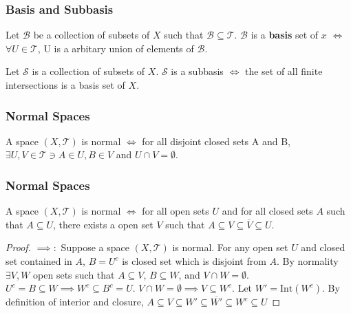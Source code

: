 \documentclass{beamer}
\newcommand*{\T}{\mathcal{T}}
\newcommand*{\B}{\mathcal{B}}
\newcommand*{\subeq}{\subseteq}
\newcommand*{\empset}{\emptyset}
\begin{document}
\begin{frame}
    \frametitle{Basis and Subbasis}

    \begin{definition}
        Let $\mathcal{B}$ be a collection of subsets of $X$ such that $\B \subeq \T$. $\mathcal{B}$ is a \textbf{basis} set of $x$ $\iff$ $\forall U \in \T$, U is a arbitary union of elements of $\B$.             
    \end{definition}
    
    \begin{definition}
        Let $\mathcal{S}$ is a collection of subsets of $X$. $\mathcal{S}$ is a subbasis $\iff$ the set of all finite intersections is a basis set of $X$.        
    \end{definition} 

\end{frame}


\begin{frame}
    \frametitle{Normal Spaces}

    \begin{definition}
        A space $(X, \T)$ is normal $\iff$ for all disjoint closed sets A and B, $\exists U, V \in \T \ni A \in U, B \in V$ and $U \cap V = \empset$.      
    \end{definition}

\end{frame}

\begin{frame}
    \frametitle{Normal Spaces}

    \begin{Theorem}
        A space $(X, \T)$ is normal $\iff$ for all open sets $U$ and for all closed sets $A$ such that $A \subeq U$, there exists a open set $V$ such that $A \subeq V \subeq \overline{V} \subeq U$.
    \end{Theorem}

    \begin{proof}
        $\implies:$ Suppose a space $(X, \T)$ is normal. For any open set $U$ and closed set contained in $A$, $B = U^c$ is closed set which is disjoint from $A$. By normality $\exists V, W$ open sets such that $A \subeq V$, $B \subeq W$, and $V \cap W = \empset$. $U^c = B \subeq W \implies W^c \subeq B^c = U$. $V \cap W = \empset \implies V \subeq W^c$. Let $W' = \text{Int}(W^c)$. By definition of interior and closure, $A \subeq V \subeq W' \subeq \overline{W'} \subeq W^c \subeq U$  
    \end{proof}

\end{frame}
\end{document}
